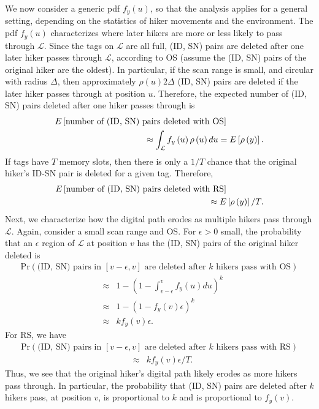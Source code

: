 We now consider a generic pdf $f_y\left(u\right)$, so that the analysis applies for a general setting, depending on the statistics of hiker movements and the environment. The pdf $f_y\left(u\right)$ characterizes where later hikers are more or less likely to pass through $\mathcal{L}$. Since the tags on $\mathcal{L}$ are all full, (ID, SN) pairs are deleted after one later hiker passes through $\mathcal{L}$, according to OS (assume the (ID, SN) pairs of the original hiker are the oldest).  In particular, if the scan range is small, and circular with radius $\Delta$, then approximately $\rho\left(u\right) 2 \Delta$ (ID, SN) pairs are deleted if the later hiker passes through at position $u$.  Therefore, the expected number of (ID, SN) pairs deleted after one hiker passes through is
\begin{eqnarray}
E \left[ \mbox{number of (ID, SN) pairs deleted with OS} \right] \hspace{.6in}  \nonumber \\
 \approx  \int_{\mathcal{L}} f_y\left(u\right) \rho\left(u\right) du = E \left[ \rho \left(y \right) \right].
\end{eqnarray}
If tags have $T$ memory slots, then there is only a $1/T$ chance that the original hiker's ID-SN pair is deleted for a given tag.  Therefore,
\begin{eqnarray}
E \left[ \mbox{number of (ID, SN) pairs deleted with RS} \right] \hspace{.6in}  \nonumber \\
 \approx E \left[ \rho \left(y \right) \right]/T.
\end{eqnarray}
Next, we characterize how the digital path erodes as multiple hikers pass through $\mathcal{L}$.  Again, consider a small scan range and OS.  For $\epsilon > 0$ small, the probability that an $\epsilon$ region of $\mathcal{L}$ at position $v$ has the (ID, SN) pairs of the original hiker deleted is
\begin{eqnarray}
\mbox{Pr} \left( \mbox{(ID, SN) pairs in $\left[v-\epsilon, v\right]$ are deleted after $k$ hikers pass with OS}\right) \nonumber
\end{eqnarray}
\begin{eqnarray}
& \approx & 1 - \left( 1 - \int_{v-\epsilon}^v f_y\left(u\right) du \right)^k \\
&  \approx & 1 - \left(1 - f_y\left(v\right) \epsilon\right)^k \\
& \approx & k f_y\left(v\right) \epsilon.
\end{eqnarray}
For RS, we have 
\begin{eqnarray}
\mbox{Pr} \left( \mbox{(ID, SN) pairs in $\left[v-\epsilon, v\right]$ are deleted after $k$ hikers pass with RS} \right) \nonumber
\end{eqnarray}
\begin{eqnarray}
& \approx & k f_y\left(v\right) \epsilon / T.
\end{eqnarray}
Thus, we see that the original hiker's digital path likely erodes as more hikers pass through. In particular, the probability that (ID, SN) pairs are deleted after $k$ hikers pass, at position $v$, is proportional to $k$ and is proportional to $f_y\left(v\right)$.

